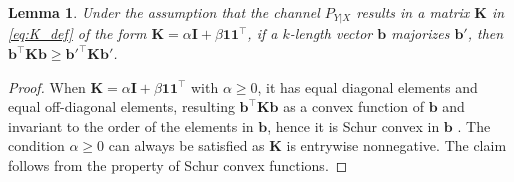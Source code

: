 \documentclass{article}
\newtheorem{lemma}{Lemma}
\begin{document}
\begin{lemma}\label{lm:schur_cvx}
Under the assumption that the channel $P_{Y|X}$ results in a matrix $\boldsymbol{K}$ in \eqref{eq:K_def} of the form $\boldsymbol{K}=\alpha \boldsymbol{I} + \beta \boldsymbol{1}\boldsymbol{1}^\top$, if a $k$-length vector ${\boldsymbol b}$ majorizes ${\boldsymbol b}'$, then ${\boldsymbol b}^\top \boldsymbol{K} {\boldsymbol b} \ge {\boldsymbol b}'^\top \boldsymbol{K} {\boldsymbol b}'$.
\end{lemma}
\begin{proof}
When $\boldsymbol{K}=\alpha \boldsymbol{I} + \beta \boldsymbol{1}\boldsymbol{1}^\top$ with $\alpha\ge 0$, it has equal diagonal elements and equal off-diagonal elements, resulting ${\boldsymbol b}^\top \boldsymbol{K} {\boldsymbol b}$ as a convex function of $\boldsymbol{b}$ and invariant to the order of the elements in $\boldsymbol{b}$, hence it is Schur convex in $\boldsymbol{b}$ \cite[Example 3.8]{SchurConvex07}. 
The condition $\alpha\ge 0$ can always be satisfied as $\boldsymbol{K}$ is entrywise nonnegative.
The claim follows from the property of Schur convex functions.
\end{proof}
\end{document}
